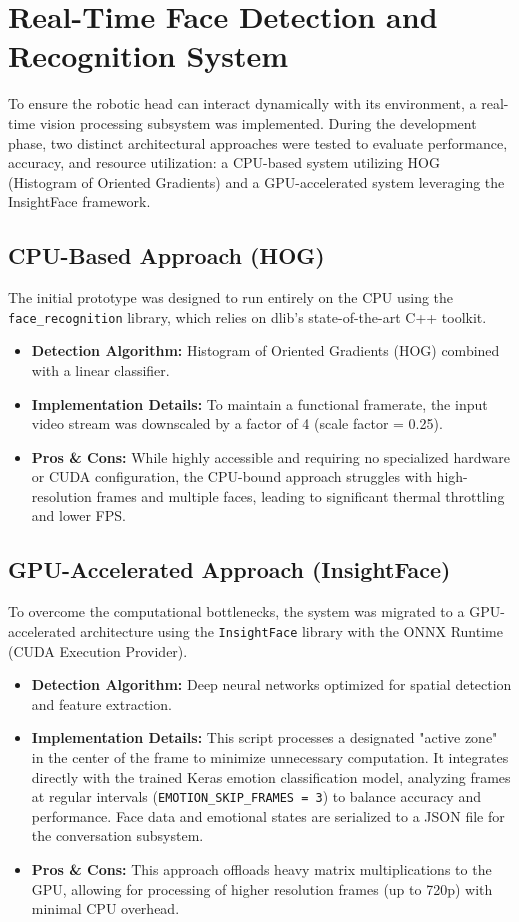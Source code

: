 \documentclass{article}
\begin{document}
\section{Real-Time Face Detection and Recognition System}
To ensure the robotic head can interact dynamically with its environment, a real-time vision processing subsystem was implemented. During the development phase, two distinct architectural approaches were tested to evaluate performance, accuracy, and resource utilization: a CPU-based system utilizing HOG (Histogram of Oriented Gradients) and a GPU-accelerated system leveraging the InsightFace framework.

\subsection{CPU-Based Approach (HOG)}
The initial prototype was designed to run entirely on the CPU using the \texttt{face\_recognition} library, which relies on dlib's state-of-the-art C++ toolkit. 
\begin{itemize}
    \item \textbf{Detection Algorithm:} Histogram of Oriented Gradients (HOG) combined with a linear classifier.
    \item \textbf{Implementation Details:} To maintain a functional framerate, the input video stream was downscaled by a factor of 4 (scale factor = 0.25). 
    \item \textbf{Pros \& Cons:} While highly accessible and requiring no specialized hardware or CUDA configuration, the CPU-bound approach struggles with high-resolution frames and multiple faces, leading to significant thermal throttling and lower FPS.
\end{itemize}

\subsection{GPU-Accelerated Approach (InsightFace)}
To overcome the computational bottlenecks, the system was migrated to a GPU-accelerated architecture using the \texttt{InsightFace} library with the ONNX Runtime (CUDA Execution Provider).
\begin{itemize}
    \item \textbf{Detection Algorithm:} Deep neural networks optimized for spatial detection and feature extraction.
    \item \textbf{Implementation Details:} This script processes a designated "active zone" in the center of the frame to minimize unnecessary computation. It integrates directly with the trained Keras emotion classification model, analyzing frames at regular intervals (\texttt{EMOTION\_SKIP\_FRAMES = 3}) to balance accuracy and performance. Face data and emotional states are serialized to a JSON file for the conversation subsystem.
    \item \textbf{Pros \& Cons:} This approach offloads heavy matrix multiplications to the GPU, allowing for processing of higher resolution frames (up to 720p) with minimal CPU overhead.
\end{itemize}
\end{document}
